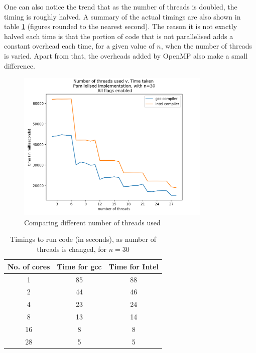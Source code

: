 \documentclass[ %
                    author={Manan Vaswani},
                supervisor={Dr. Raphael Clifford},
                    degree={MEng},
                     title={A multi-core CPU implementation of the classical Boson Sampling algorithm},
                  subtitle={},
                      type={},
                      year={2019} ]{dissertation}
\theoremstyle{plain}
\theoremstyle{definition}
\begin{document}
One can also notice the trend that as the number of threads is doubled, the timing is roughly halved. A summary of the actual timings are also shown in table \ref{tab:threads} (figures rounded to the nearest second).
The reason it is not exactly halved each time is that the portion of code that is not parallelised adds a constant overhead each time, for a given value of $n$, when the number of threads is varied. Apart from that, the overheads added by OpenMP also make a small difference.
\begin{figure}
	\centering
  \includegraphics[width=25em]{Graphs/threadCurve_linear.png}
  \caption{Comparing different number of threads used}
  \label{fig:threadCurve}
\end{figure}

\begin{table}
  \begin{center}
    \caption{Timings to run code (in seconds), as number of threads is changed, for $n=30$}
    \label{tab:threads}
    \begin{tabular}{|c|cc|}
    \hline
      \textbf{No. of cores} & \textbf{Time for gcc} & \textbf{Time for Intel} \\
      \hline
      1 & 85 & 88 \\
      2 & 44 & 46  \\
      4 & 23 & 24 \\
      8 & 13 & 14 \\
      16 & 8 & 8 \\
      28 & 5 & 5 \\
      \hline
    \end{tabular}
  \end{center}
\end{table}
\end{document}
